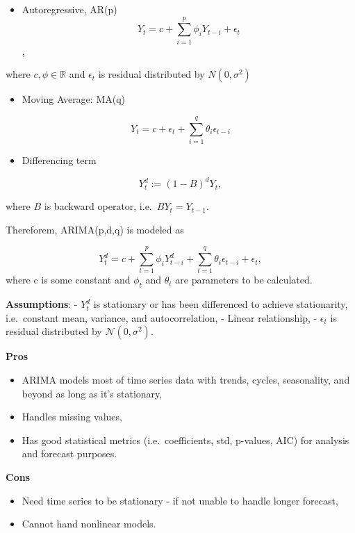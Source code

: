 \documentclass[11pt]{article}
\providecommand{\tightlist}{%
      \setlength{\itemsep}{0pt}\setlength{\parskip}{0pt}}
\begin{document}
\begin{itemize}
\tightlist
\item
  Autoregressive, AR(p) \[ 
    Y_t = c + \sum_{i=1}^{p} \phi_i Y_{t-i} + \epsilon_t 
    \],
\end{itemize}

where \(c, \phi \in \mathbb{R}\) and \(\epsilon_t\) is residual
distributed by \(N(0, \sigma^2)\)

\begin{itemize}
\tightlist
\item
  Moving Average: MA(q)
\end{itemize}

\[ Y_t = c + \epsilon_t + \sum_{i=1}^{q} \theta_i \epsilon_{t-i} \]

\begin{itemize}
\tightlist
\item
  Differencing term
\end{itemize}

\[ Y_t^d := (1-B)^d Y_t,\]

where \(B\) is backward operator, i.e.~\(BY_t = Y_{t-1}\).

Thereforem, ARIMA(p,d,q) is modeled as

\[
    Y_t^d = c + \sum_{t=1}^{p} \phi_i Y_{t-i}^d + \sum_{t=1}^{q} \theta_i \epsilon_{t-i} + \epsilon_t,
\] where c is some constant and \(\phi_t\) and \(\theta_t\) are
parameters to be calculated.

{\textbf{Assumptions}}: - \(Y_t^d\) is stationary or has been
differenced to achieve stationarity, i.e.~constant mean, variance, and
autocorrelation, - Linear relationship, - \(\epsilon_t\) is residual
distributed by \(\mathcal{N}(0, \sigma^2)\).

\textbf{Pros}

\begin{itemize}
\tightlist
\item
  ARIMA models most of time series data with trends, cycles,
  seasonality, and beyond as long as it's stationary,
\item
  Handles missing values,
\item
  Has good statistical metrics (i.e.~coefficients, std, p-values, AIC)
  for analysis and forecast purposes.
\end{itemize}

\textbf{Cons}

\begin{itemize}
\tightlist
\item
  Need time series to be stationary - if not unable to handle longer
  forecast,
\item
  Cannot hand nonlinear models.
\end{itemize}
\end{document}
